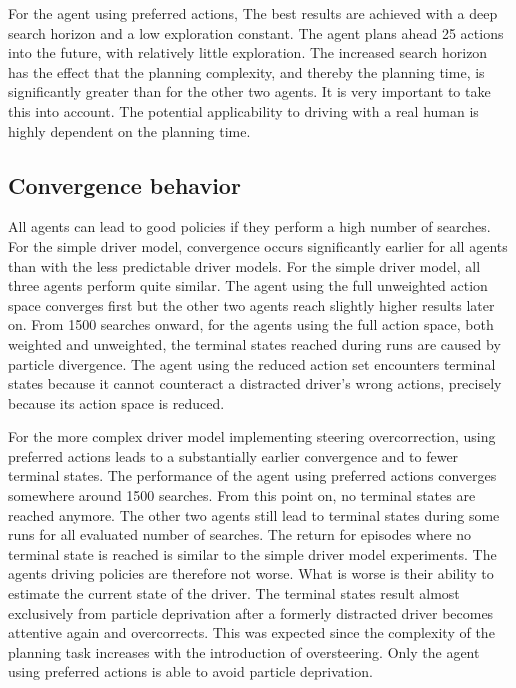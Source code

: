 
For the agent using preferred actions, The best results are achieved with a deep search horizon and a low exploration constant. The agent plans ahead 25 actions into the future, with relatively little exploration. The increased search horizon has the effect that the planning complexity, and thereby the planning time, is significantly greater than for the other two agents. It is very important to take this into account. The potential applicability to driving with a real human is highly dependent on the planning time.

\subsection{Convergence behavior}

All agents can lead to good policies if they perform a high number of searches. For the simple driver model, convergence occurs significantly earlier for all agents than with the less predictable driver models. For the simple driver model, all three agents perform quite similar. The agent using the full unweighted action space converges first but the other two agents reach slightly higher results later on. From 1500 searches onward, for the agents using the full action space, both weighted and unweighted, the terminal states reached during runs are caused by particle divergence. The agent using the reduced action set encounters terminal states because it cannot counteract a distracted driver's wrong actions, precisely because its action space is reduced.

For the more complex driver model implementing steering overcorrection, using preferred actions leads to a substantially earlier convergence and to fewer terminal states. The performance of the agent using preferred actions converges somewhere around 1500 searches. From this point on, no terminal states are reached anymore. The other two agents still lead to terminal states during some runs for all evaluated number of searches. The return for episodes where no terminal state is reached is similar to the simple driver model experiments. The agents driving policies are therefore not worse. What is worse is their ability to estimate the current state of the driver. The terminal states result almost exclusively from particle deprivation after a formerly distracted driver becomes attentive again and overcorrects. This was expected since the complexity of the planning task increases with the introduction of oversteering. Only the agent using preferred actions is able to avoid particle deprivation.

